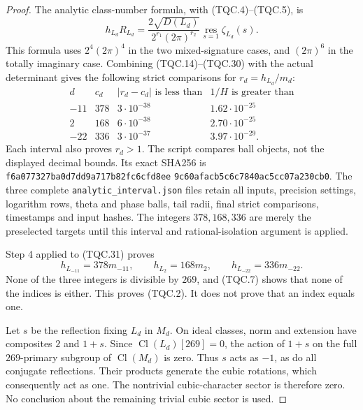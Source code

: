 \begin{proof}
The analytic class-number formula, with (TQC.4)--(TQC.5), is
\[
 h_{L_d}R_{L_d}
   =\frac{2\sqrt{D(L_d)}}{2^{r_1}(2\pi)^{r_2}}
                   \operatorname*{res}_{s=1}\zeta_{L_d}(s).
 \tag{TQC.30}
\]
This formula uses $2^4(2\pi)^4$ in the two mixed-signature cases,
and $(2\pi)^6$ in the totally imaginary case.
Combining (TQC.14)--(TQC.30) with the actual determinant gives
the following strict comparisons for $r_d=h_{L_d}/m_d$:
\[
\begin{array}{c|r|c|c}
d&c_d&|r_d-c_d|\text{ is less than}&1/H\text{ is greater than}\\\hline
-11&378&3\cdot10^{-38}&1.62\cdot10^{-25}\\
2&168&6\cdot10^{-38}&2.70\cdot10^{-25}\\
-22&336&3\cdot10^{-37}&3.97\cdot10^{-29}.
\end{array}
\tag{TQC.31}
\]
Each interval also proves $r_d>1$.
The script compares ball objects, not the displayed decimal bounds.
Its exact SHA256 is
\texttt{f6a077327ba0d7dd9a717b82fc6cfd8ee}\allowbreak
\texttt{9c60afacb5c6c7840ac5cc07a230cb0}.
The three complete \texttt{analytic\_interval.json} files retain
all inputs, precision settings, logarithm rows, theta and phase balls,
tail radii, final strict comparisons, timestamps and input hashes.
The integers $378,168,336$ are merely the preselected targets
until this interval and rational-isolation argument is applied.

Step 4 applied to (TQC.31) proves
\[
 h_{L_{-11}}=378m_{-11},\qquad
 h_{L_2}=168m_2,\qquad h_{L_{-22}}=336m_{-22}.
 \tag{TQC.32}
\]
None of the three integers is divisible by $269$, and (TQC.7)
shows that none of the indices is either.  This proves (TQC.2).
It does not prove that an index equals one.

Let $s$ be the reflection fixing $L_d$ in $M_d$.
On ideal classes, norm and extension have composites $2$ and $1+s$.
Since $\operatorname{Cl}(L_d)[269]=0$, the action of $1+s$ on
the full $269$-primary subgroup of $\operatorname{Cl}(M_d)$ is zero.
Thus $s$ acts as $-1$, as do all conjugate reflections.
Their products generate the cubic rotations, which consequently
act as one.  The nontrivial cubic-character sector is therefore zero.
No conclusion about the remaining trivial cubic sector is used.
\end{proof}


